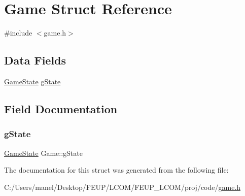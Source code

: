 \hypertarget{struct_game}{}\section{Game Struct Reference}
\label{struct_game}


{\ttfamily \#include $<$game.\+h$>$}

\subsection*{Data Fields}
\begin{DoxyCompactItemize}
\item 
\mbox{\hyperlink{group__game_ga7899b65f1ea0f655e4bbf8d2a5714285}{Game\+State}} \mbox{\hyperlink{struct_game_a5025796ab1e0e6011470d95c154273fb}{g\+State}}
\end{DoxyCompactItemize}


\subsection{Field Documentation}
\mbox{\label{struct_game_a5025796ab1e0e6011470d95c154273fb}} 
\subsubsection{\texorpdfstring{gState}{gState}}
{\footnotesize\ttfamily \mbox{\hyperlink{group__game_ga7899b65f1ea0f655e4bbf8d2a5714285}{Game\+State}} Game\+::g\+State}



The documentation for this struct was generated from the following file\+:\begin{DoxyCompactItemize}
\item 
C\+:/\+Users/manel/\+Desktop/\+F\+E\+U\+P/\+L\+C\+O\+M/\+F\+E\+U\+P\+\_\+\+L\+C\+O\+M/proj/code/\mbox{\hyperlink{game_8h}{game.\+h}}\end{DoxyCompactItemize}

